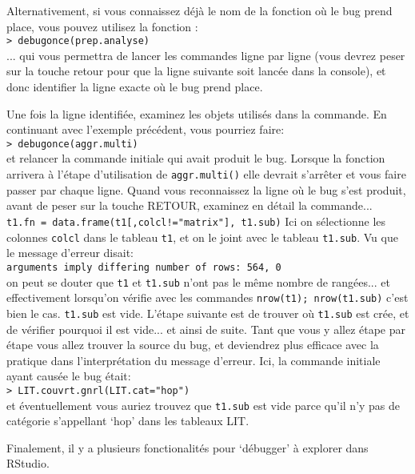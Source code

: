 \documentclass{article}
\begin{document}
Alternativement, si vous connaissez déjà le nom de la fonction où le
bug prend place, vous pouvez utilisez la fonction
:\\
\texttt{> debugonce(prep.analyse)}\\

... qui vous permettra de lancer les commandes ligne par ligne (vous
devrez peser sur la touche retour pour que la ligne suivante soit
lancée dans la console), et donc identifier la ligne exacte où le bug
prend place.

Une fois la ligne identifiée, examinez les objets utilisés dans la
commande. En continuant avec l'exemple précédent, vous pourriez
faire:\\
\texttt{> debugonce(aggr.multi)}\\
et relancer la commande initiale qui avait produit le bug. Lorsque la
fonction arrivera à l'étape d'utilisation de \texttt{aggr.multi()}
elle devrait s'arrêter et vous faire passer par chaque ligne. Quand
vous reconnaissez la ligne où le bug s'est produit, avant de peser sur
la touche RETOUR, examinez en détail la commande...
\texttt{ t1.fn = data.frame(t1[,colcl!="matrix"], t1.sub)}
Ici on sélectionne les colonnes \texttt{colcl} dans le tableau
\texttt{t1}, et on le joint avec le tableau \texttt{t1.sub}. Vu que le
message d'erreur disait:\\
\texttt{arguments imply differing number of rows: 564, 0}\\
on peut se douter que \texttt{t1} et \texttt{t1.sub} n'ont pas le même
nombre de rangées... et effectivement lorsqu'on vérifie avec les
commandes \texttt{nrow(t1); nrow(t1.sub)} c'est bien le
cas. \texttt{t1.sub} est vide. L'étape suivante est de trouver où
\texttt{t1.sub} est crée, et de vérifier pourquoi il est vide... et
ainsi de suite. Tant que vous y allez étape par étape vous allez
trouver la source du bug, et deviendrez plus efficace avec la pratique
dans l'interprétation du message d'erreur. Ici, la commande initiale
ayant causée le bug était: \\
\texttt{> LIT.couvrt.gnrl(LIT.cat="hop")}\\
et éventuellement vous auriez trouvez que \texttt{t1.sub} est vide
parce qu'il n'y pas de catégorie s'appellant `hop' dans les tableaux LIT.

Finalement, il y a plusieurs fonctionalités pour `débugger' à explorer
dans RStudio.

\begin{comment}
\section{Informations supplémentaires}
\subsection{Fichiers de code R requis}


\end{comment}
\end{document}
